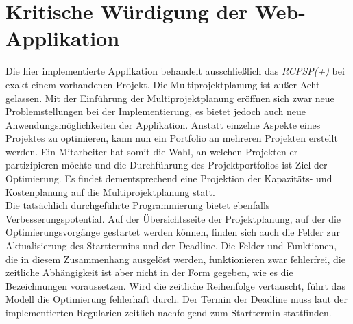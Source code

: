 \documentclass[a4paper,12pt,parskip,bibtotoc,liststotoc]{article}
\begin{document}



\section{Kritische Würdigung der Web-Applikation} \label{krit}
Die hier implementierte Applikation behandelt ausschließlich das \textit{RCPSP(+)} bei exakt einem vorhandenen Projekt. Die Multiprojektplanung ist außer Acht gelassen. Mit der Einführung der Multiprojektplanung eröffnen sich zwar neue Problemstellungen bei der Implementierung, es bietet jedoch auch neue Anwendungsmöglichkeiten der Applikation. Anstatt einzelne Aspekte eines Projektes zu optimieren, kann nun ein Portfolio an mehreren Projekten erstellt werden. Ein Mitarbeiter hat somit die Wahl, an welchen Projekten er partizipieren möchte und die Durchführung des Projektportfolios ist Ziel der Optimierung. Es findet dementsprechend eine Projektion der Kapazitäts- und Kostenplanung auf die Multiprojektplanung statt.\\

Die tatsächlich durchgeführte Programmierung bietet ebenfalls Verbesserungspotential. Auf der Übersichtsseite der Projektplanung, auf der die Optimierungsvorgänge gestartet werden können, finden sich auch die Felder zur Aktualisierung des Starttermins und der Deadline. Die Felder und Funktionen, die in diesem Zusammenhang ausgelöst werden, funktionieren zwar fehlerfrei, die zeitliche Abhängigkeit ist aber nicht in der Form gegeben, wie es die Bezeichnungen voraussetzen. Wird die zeitliche Reihenfolge vertauscht, führt das Modell die Optimierung fehlerhaft durch. Der Termin der Deadline muss laut der implementierten Regularien zeitlich nachfolgend zum Starttermin stattfinden. \\
\end{document}
